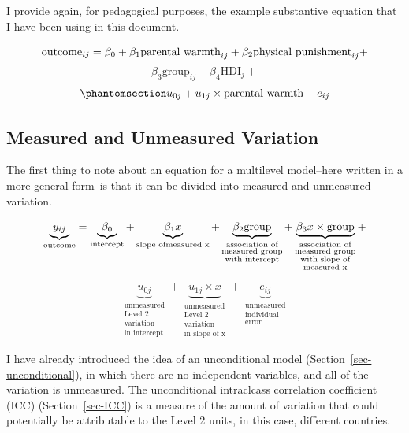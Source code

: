 \documentclass[
  letterpaper,
  DIV=11,
  numbers=noendperiod]{scrreprt}
\begin{document}
I provide again, for pedagogical purposes, the example substantive
equation that I have been using in this document.

\[\text{outcome}_{ij} = \beta_0 + \beta_1 \text{parental warmth}_{ij} + \\ \beta_2 \text{physical punishment}_{ij} +\]
\[\beta_3 \text{group}_{ij} + \beta_4 \text{HDI}_{j} + \]
\begin{equation}\phantomsection\label{eq-MLMsubstantive2}{u_{0j} + u_{1j} \times \text{parental warmth} + e_{ij}}\end{equation}

\subsection{Measured and Unmeasured
Variation}\label{measured-and-unmeasured-variation}

The first thing to note about an equation for a multilevel model--here
written in a more general form--is that it can be divided into measured
and unmeasured variation.

\[\underbrace{y_{ij}}_\text{outcome} = \underbrace{\beta_0}_\text{intercept} + \underbrace{\beta_1 x}_{\text{slope of} \\ \text{measured x}} + \underbrace{\beta_2 \text{group}}_{\substack{\text{association of} \\ \text{measured group} \\ \text{with intercept}}} + \underbrace{\beta_3 x \times \text{group}}_{\substack{\text{association of} \\ \text{measured group} \\ \text{with slope of} \\  \text{measured x}}} + \]

\[\underbrace{u_{0j}}_{\substack{\text{unmeasured} \\ \text{Level 2} \\ \text{variation} \\ \text{in intercept}}} + \underbrace{u_{1j} \times x}_{\substack{\text{unmeasured} \\ \text{Level 2} \\ \text{variation} \\ \text{in slope of x}}} + \underbrace{e_{ij}}_{\substack{\text{unmeasured} \\ \text{individual} \\ \text{error}}}\]

I have already introduced the idea of an unconditional model
(Section~\ref{sec-unconditional}), in which there are no independent
variables, and all of the variation is unmeasured. The unconditional
intraclcass correlation coefficient (ICC) (Section~\ref{sec-ICC}) is a
measure of the amount of variation that could potentially be
attributable to the Level 2 units, in this case, different countries.
\end{document}
